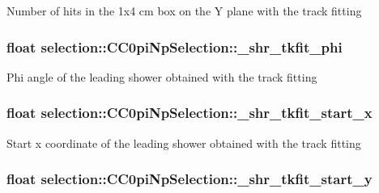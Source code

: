 Number of hits in the 1x4 cm box on the Y plane with the track fitting \hypertarget{classselection_1_1CC0piNpSelection_aefb0bc61c417330a448ababb5363ad8f}{
\subsubsection[{\-\_\-shr\-\_\-tkfit\-\_\-phi}]{\setlength{\rightskip}{0pt plus 5cm}float selection\-::\-C\-C0pi\-Np\-Selection\-::\-\_\-shr\-\_\-tkfit\-\_\-phi\hspace{0.3cm}{\ttfamily [private]}}}\label{classselection_1_1CC0piNpSelection_aefb0bc61c417330a448ababb5363ad8f}
Phi angle of the leading shower obtained with the track fitting \hypertarget{classselection_1_1CC0piNpSelection_a44002e3cc4d16dce6e6f61ee3a2bae6a}{
\subsubsection[{\-\_\-shr\-\_\-tkfit\-\_\-start\-\_\-x}]{\setlength{\rightskip}{0pt plus 5cm}float selection\-::\-C\-C0pi\-Np\-Selection\-::\-\_\-shr\-\_\-tkfit\-\_\-start\-\_\-x\hspace{0.3cm}{\ttfamily [private]}}}\label{classselection_1_1CC0piNpSelection_a44002e3cc4d16dce6e6f61ee3a2bae6a}
Start x coordinate of the leading shower obtained with the track fitting \hypertarget{classselection_1_1CC0piNpSelection_acd1826c44855b71bce92253f7ac1a758}{
\subsubsection[{\-\_\-shr\-\_\-tkfit\-\_\-start\-\_\-y}]{\setlength{\rightskip}{0pt plus 5cm}float selection\-::\-C\-C0pi\-Np\-Selection\-::\-\_\-shr\-\_\-tkfit\-\_\-start\-\_\-y\hspace{0.3cm}{\ttfamily [private]}}}\label{classselection_1_1CC0piNpSelection_acd1826c44855b71bce92253f7ac1a758}
